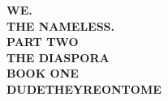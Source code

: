 \clearpage
\thispagestyle{empty}
\vspace*{\fill}
\begin{center}
	{\fontsize{42pt}{50pt}\selectfont\bfseries WE.}\\[0.35em]
	{\fontsize{42pt}{50pt}\selectfont\bfseries THE NAMELESS.}\\[1.5em]
	{\LARGE\bfseries PART TWO}\\[0.6em]
	{\Huge\bfseries THE DIASPORA}\\[1.5em]
	{\Large\bfseries BOOK ONE}\\[0.6em]
	{\Huge\bfseries DUDETHEYREONTOME}
\end{center}
\vspace*{\fill}
\clearpage
